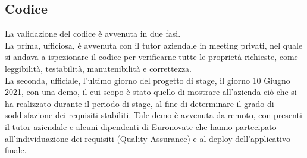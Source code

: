 		\subsection{Codice}
			La validazione del codice è avvenuta in due fasi.\\
			La prima, ufficiosa, è avvenuta con il tutor aziendale in meeting privati, nel quale si andava a ispezionare il codice per verificarne tutte le proprietà richieste, come leggibilità, testabilità, manutenibilità e correttezza. \\
			La seconda, ufficiale, l'ultimo giorno del progetto di stage, il giorno 10 Giugno 2021, con una demo, il cui scopo è stato quello di mostrare all'azienda ciò che si ha realizzato durante il periodo di stage, al fine di determinare il grado di soddisfazione dei requisiti stabiliti. Tale demo è avvenuta da remoto, con presenti il tutor aziendale e alcuni dipendenti di Euronovate che hanno partecipato all'individuazione dei requisiti (Quality Assurance) e al deploy dell'applicativo finale. \\
			